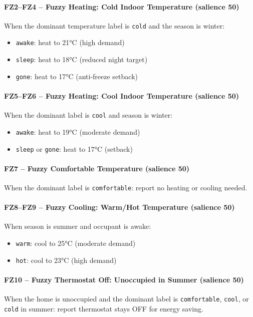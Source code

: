 \documentclass{article}
\begin{document}
\paragraph{FZ2–FZ4 -- Fuzzy Heating: Cold Indoor Temperature (salience 50)}
When the dominant temperature label is \texttt{cold} and the season is winter:
\begin{itemize}
    \item \texttt{awake}: heat to 21°C (high demand)
    \item \texttt{sleep}: heat to 18°C (reduced night target)
    \item \texttt{gone}: heat to 17°C (anti-freeze setback)
\end{itemize}

\paragraph{FZ5–FZ6 -- Fuzzy Heating: Cool Indoor Temperature (salience 50)}
When the dominant label is \texttt{cool} and season is winter:
\begin{itemize}
    \item \texttt{awake}: heat to 19°C (moderate demand)
    \item \texttt{sleep} or \texttt{gone}: heat to 17°C (setback)
\end{itemize}

\paragraph{FZ7 -- Fuzzy Comfortable Temperature (salience 50)}
When the dominant label is \texttt{comfortable}: report no heating or cooling needed.

\paragraph{FZ8–FZ9 -- Fuzzy Cooling: Warm/Hot Temperature (salience 50)}
When season is summer and occupant is awake:
\begin{itemize}
    \item \texttt{warm}: cool to 25°C (moderate demand)
    \item \texttt{hot}: cool to 23°C (high demand)
\end{itemize}

\paragraph{FZ10 -- Fuzzy Thermostat Off: Unoccupied in Summer (salience 50)}
When the home is unoccupied and the dominant label is \texttt{comfortable}, \texttt{cool}, or \texttt{cold} in summer: report thermostat stays OFF for energy saving.
\end{document}
